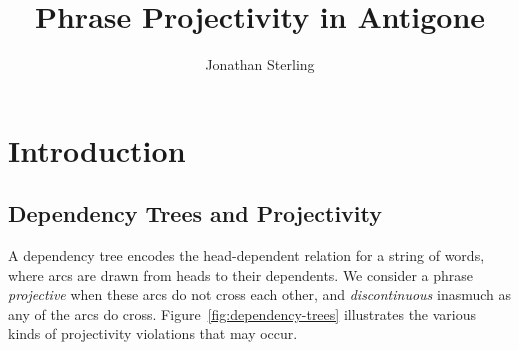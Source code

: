 \documentclass{article}
\newcommand{\Varid}[1]{\mathit{#1}}
\def\resethooks{%
  \global\let\SaveRestoreHook\empty
  \global\let\ColumnHook\empty}
\let\hspre\empty
\let\hspost\empty
\newcommand\VarId[1]{\mathord{\textcolor{VarId}{#1}}}
\let\Varid\VarId
\newcommand\VarSym[1]{\mathbin{\textcolor{VarSym}{#1}}}
\newcommand\Comment[1]{\textcolor{Comment}{\textit{\textsf{#1}}}}
\newcommand{\FN}{\mathsf}
\newcommand{\ignore}[1]{}
\begin{document}
\setmainfont{Times New Roman}

\author{Jonathan Sterling}

\title{Phrase Projectivity in Antigone}
\maketitle

\ignore{
\begin{hscode}\SaveRestoreHook
\column{B}{@{}>{\hspre}l<{\hspost}@{}}%
\column{3}{@{}>{\hspre}l<{\hspost}@{}}%
\column{E}{@{}>{\hspre}l<{\hspost}@{}}%
\>[3]{}\Comment{\{-\#\enskip LANGUAGE StandaloneDeriving \enskip\#-\}}{}\<[E]%
\ColumnHook
\end{hscode}\resethooks
\begin{hscode}\SaveRestoreHook
\column{B}{@{}>{\hspre}l<{\hspost}@{}}%
\column{3}{@{}>{\hspre}l<{\hspost}@{}}%
\column{E}{@{}>{\hspre}l<{\hspost}@{}}%
\>[3]{}\mathkw{module}\;\mathsf{Analyze}\;\mathkw{where}{}\<[E]%
\\
\>[3]{}\mathkw{import}\;\mathsf{\mathsf{Control}.Applicative}{}\<[E]%
\\
\>[3]{}\mathkw{import}\;\mathsf{\mathsf{Control}.Arrow}\;((\VarSym{\&\&\&})){}\<[E]%
\\
\>[3]{}\mathkw{import}\;\mathsf{\mathsf{Data}.Foldable}{}\<[E]%
\\
\>[3]{}\mathkw{import}\;\mathsf{\mathsf{Data}.Monoid}{}\<[E]%
\\
\>[3]{}\mathkw{import}\;\mathsf{\mathsf{Data}.Tree}{}\<[E]%
\\
\>[3]{}\mathkw{import}\;\mathsf{\mathsf{Data}.List}\;(\Varid{genericLength}){}\<[E]%
\\
\>[3]{}\mathkw{import}\;\mathsf{Prelude}\;\Varid{hiding}\;(\FN{maximum},\FN{minimum},\FN{foldl},\cdot \notin\cdot ){}\<[E]%
\ColumnHook
\end{hscode}\resethooks
}

\section{Introduction}
\label{sec:introduction}

\subsection{Dependency Trees and Projectivity}
\label{sec:introduction.dependency}

A dependency tree encodes the head-dependent relation for a string of words,
where arcs are drawn from heads to their dependents. We consider a phrase
\emph{projective} when these arcs do not cross each other, and
\emph{discontinuous} inasmuch as any of the arcs do cross.
Figure~\ref{fig:dependency-trees} illustrates the various kinds of projectivity
violations that may occur.
\end{document}
